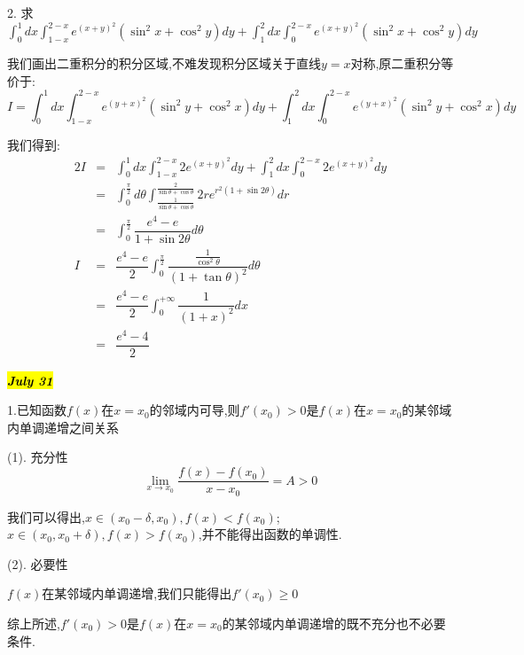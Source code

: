 2. 求$\int_{0}^{1}dx\int_{1-x}^{2-x}e^{(x+y)^2}(\sin^2x+\cos^2y)dy+\int_{1}^{2}dx\int_{0}^{2-x}e^{(x+y)^2}(\sin^2x+\cos^2y)dy$
\begin{solution}
	
	我们画出二重积分的积分区域,不难发现积分区域关于直线$y=x$对称,原二重积分等价于: 
	$$I=\int_{0}^{1}dx\int_{1-x}^{2-x}e^{(y+x)^2}(\sin^2y+\cos^2x)dy+\int_{1}^{2}dx\int_{0}^{2-x}e^{(y+x)^2}(\sin^2y+\cos^2x)dy$$
	
	我们得到: 
	\begin{eqnarray*}
		2I&=&\int_{0}^{1}dx\int_{1-x}^{2-x}2e^{(x+y)^2}dy+\int_{1}^{2}dx\int_{0}^{2-x}2e^{(x+y)^2}dy\\
		&=&\int_{0}^{\frac{\pi}{2}}d\theta\int_{\frac{1}{\sin\theta+\cos\theta}}^{\frac{2}{\sin\theta+\cos\theta}}2re^{r^2(1+\sin 2\theta)}dr\\
		&=&\int_{0}^{\frac{\pi}{2}}\dfrac{e^4-e}{1+\sin2\theta}d\theta\\
		I&=&\dfrac{e^4-e}{2}\int_{0}^{\frac{\pi}{2}}\dfrac{\frac{1}{\cos^2\theta}}{(1+\tan\theta)^2}d\theta\\
		&=&\dfrac{e^4-e}{2}\int_{0}^{+\infty}\dfrac{1}{(1+x)^2}dx\\
		&=&\dfrac{e^4-4}{2}
	\end{eqnarray*}
\end{solution}

\hl{\textbf{\textit{July 31}}}

1.已知函数$f(x)$在$x=x_{0}$的邻域内可导,则$f'(x_{0})>0$是$f(x)$在$x=x_{0}$的某邻域内单调递增之间关系
\begin{solution}
	
	(1). 充分性
	$$\lim\limits_{x\rightarrow x_{0}}\dfrac{f(x)-f(x_{0})}{x-x_{0}}=A>0$$
	
	我们可以得出,$x\in(x_{0}-\delta,x_{0}),f(x)<f(x_{0})$;$x\in(x_{0},x_{0}+\delta),f(x)>f(x_{0})$,并不能得出函数的单调性.
	
	(2). 必要性
	
	$f(x)$在某邻域内单调递增,我们只能得出$f'(x_{0})\geq 0$
	
	综上所述,$f'(x_{0})>0$是$f(x)$在$x=x_{0}$的某邻域内单调递增的既不充分也不必要条件.
\end{solution}

